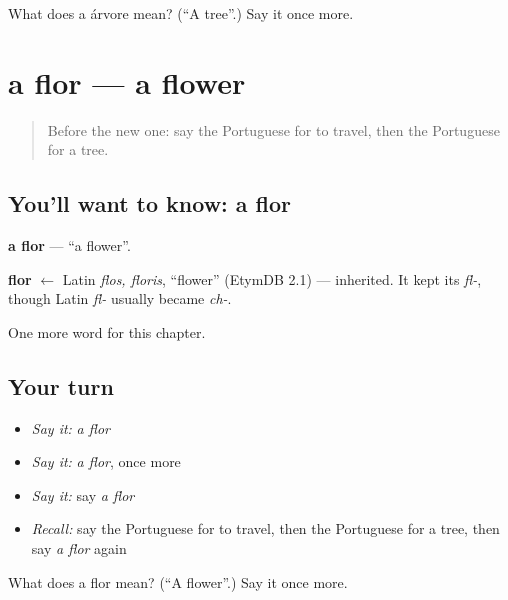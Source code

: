 \begin{tcolorbox}[breakable,colback=teal!4,colframe=teal!35!black,title={Before you move on}]
What does a árvore mean? (\textquotedblleft{}A tree\textquotedblright{}.) Say it once more.
\end{tcolorbox}
\section[a flor]{a flor — a flower}

\label{lesson:PT-C56-flor}



\begin{quote}
Before the new one: say the Portuguese for to travel, then the Portuguese for a tree.
\end{quote}

\subsection*{You'll want to know: a flor}
\textbf{a flor} — \textquotedblleft{}a flower\textquotedblright{}.

\begin{cousinweb}
\textbf{flor} $\leftarrow$ Latin \emph{flos, floris}, \textquotedblleft{}flower\textquotedblright{} (EtymDB 2.1) — inherited. It kept its \emph{fl-}, though Latin \emph{fl-} usually became \emph{ch-}.
\end{cousinweb}

\begin{grammarlens}[title={What you've built}]
One more word for this chapter.
\end{grammarlens}

\subsection*{Your turn}
\begin{itemize}
\raggedright
  \item \emph{Say it:} \emph{a flor}
  \item \emph{Say it:} \emph{a flor}, once more
  \item \emph{Say it:} say \emph{a flor}
  \item \emph{Recall:} say the Portuguese for to travel, then the Portuguese for a tree, then say \emph{a flor} again
\end{itemize}

\begin{tcolorbox}[breakable,colback=teal!4,colframe=teal!35!black,title={Before you move on}]
What does a flor mean? (\textquotedblleft{}A flower\textquotedblright{}.) Say it once more.
\end{tcolorbox}
